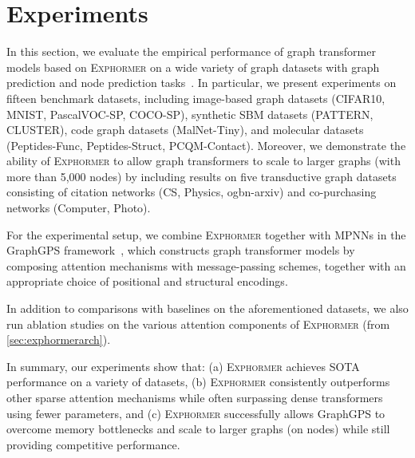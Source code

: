 \documentclass{article}
\theoremstyle{plain}
\theoremstyle{definition}
\theoremstyle{remark}
\begin{document}
\section{Experiments} \label{sec:experiments}
In this section, we evaluate the empirical performance of graph transformer models based on \textsc{Exphormer} on a wide variety of graph datasets with graph prediction and node prediction tasks~\cite{DwivediJLBB20,HuFZDRLCL20,FreitasDNC21,amazon_dataset,namata:mlg12-wkshp}. In particular, we present experiments on fifteen benchmark datasets, including image-based graph datasets (CIFAR10, MNIST, PascalVOC-SP, COCO-SP), synthetic SBM datasets (PATTERN, CLUSTER), code graph datasets (MalNet-Tiny), and molecular datasets (Peptides-Func, Peptides-Struct, PCQM-Contact). Moreover, we demonstrate the ability of \textsc{Exphormer} to allow graph transformers to scale to larger graphs (with more than 5,000 nodes) by including results on five transductive graph datasets consisting of citation networks (CS, Physics, ogbn-arxiv) and co-purchasing networks (Computer, Photo).


For the experimental setup, we combine \textsc{Exphormer} together with MPNNs in the GraphGPS framework~\citep{RampasekGDLWB22}, which constructs graph transformer models by composing attention mechanisms with message-passing schemes, together with an appropriate choice of positional and structural encodings.

In addition to comparisons with baselines on the aforementioned datasets, we also run ablation studies on the various attention components of \textsc{Exphormer} (from \cref{sec:exphormerarch}).


In summary, our experiments show that: (a) \textsc{Exphormer} achieves SOTA performance on a variety of datasets, (b) \textsc{Exphormer} consistently outperforms other sparse attention mechanisms while often surpassing dense transformers using fewer parameters, and (c) \textsc{Exphormer} successfully allows GraphGPS to overcome memory bottlenecks and scale to larger graphs (on  nodes) while still providing competitive performance.
\end{document}
